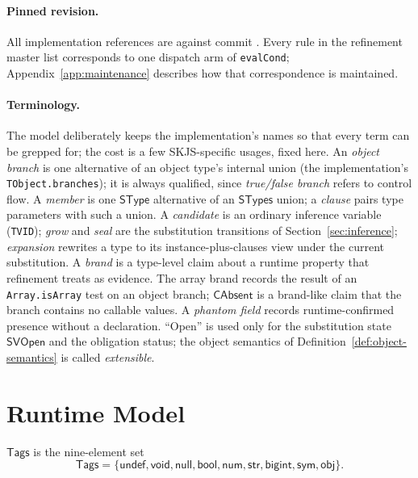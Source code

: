 \documentclass[11pt]{article}
\newcommand{\SType}{\mathsf{SType}}
\newcommand{\Tags}{\mathsf{Tags}}
\newcommand{\STypes}{\mathsf{STypes}}
\newcommand{\SVOpen}{\mathsf{SVOpen}}
\begin{document}
\paragraph{Pinned revision.}
All implementation references are against commit \texttt{\skjspinhash}.
Every rule in the refinement master list corresponds to one dispatch arm of
\texttt{evalCond}; Appendix~\ref{app:maintenance} describes how that
correspondence is maintained.

\paragraph{Terminology.}
The model deliberately keeps the implementation's names so that every term
can be grepped for; the cost is a few SKJS-specific usages, fixed here.
An \emph{object branch} is one alternative of an object type's internal
union (the implementation's \texttt{TObject.branches}); it is always
qualified, since \emph{true/false branch} refers to control flow.
A \emph{member} is one $\SType$ alternative of an $\STypes$ union;
a \emph{clause} pairs type parameters with such a union.
A \emph{candidate} is an ordinary inference variable (\texttt{TVID});
\emph{grow} and \emph{seal} are the substitution transitions of
Section~\ref{sec:inference}; \emph{expansion} rewrites a type to its
instance-plus-clauses view under the current substitution.
A \emph{brand} is a type-level claim about a runtime property that
refinement treats as evidence. The array brand records the result of an
\texttt{Array.isArray} test on an object branch; $\mathsf{CAbsent}$ is a
brand-like claim that the branch contains no callable values.
A \emph{phantom field} records runtime-confirmed presence without a
declaration. ``Open'' is used only for the substitution state
$\SVOpen$ and the obligation status; the object semantics of
Definition~\ref{def:object-semantics} is called \emph{extensible}.

\section{Runtime Model}
\label{sec:runtime}

\begin{definition}
\label{def:runtime-tags}
$\Tags$ is the nine-element set
\[
\Tags = \{\mathsf{undef}, \mathsf{void}, \mathsf{null}, \mathsf{bool},
          \mathsf{num}, \mathsf{str}, \mathsf{bigint}, \mathsf{sym},
          \mathsf{obj}\}.
\]
\end{definition}
\end{document}
